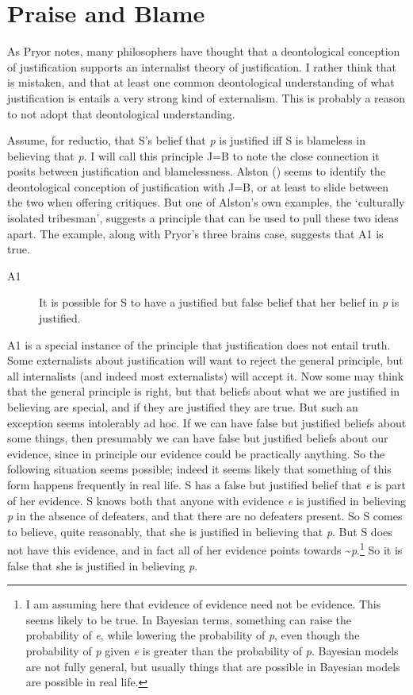 \documentclass[
  10pt,
  letterpaper,
  DIV=11,
  numbers=noendperiod,
  twoside]{scrartcl}
\begin{document}
\section{Praise and Blame}\label{praise-and-blame}

As Pryor notes, many philosophers have thought that a deontological
conception of justification supports an internalist theory of
justification. I rather think that is mistaken, and that at least one
common deontological understanding of what justification is entails a
very strong kind of externalism. This is probably a reason to not adopt
that deontological understanding.

Assume, for reductio, that S's belief that \emph{p} is justified iff S
is blameless in believing that \emph{p}. I will call this principle J=B
to note the close connection it posits between justification and
blamelessness. Alston () seems to
identify the deontological conception of justification with J=B, or at
least to slide between the two when offering critiques. But one of
Alston's own examples, the `culturally isolated tribesman', suggests a
principle that can be used to pull these two ideas apart. The example,
along with Pryor's three brains case, suggests that A1 is true.

\begin{description}
\item[A1]
It is possible for S to have a justified but false belief that her
belief in \emph{p} is justified.
\end{description}

A1 is a special instance of the principle that justification does not
entail truth. Some externalists about justification will want to reject
the general principle, but all internalists (and indeed most
externalists) will accept it. Now some may think that the general
principle is right, but that beliefs about what we are justified in
believing are special, and if they are justified they are true. But such
an exception seems intolerably ad hoc. If we can have false but
justified beliefs about some things, then presumably we can have false
but justified beliefs about our evidence, since in principle our
evidence could be practically anything. So the following situation seems
possible; indeed it seems likely that something of this form happens
frequently in real life. S has a false but justified belief that
\emph{e} is part of her evidence. S knows both that anyone with evidence
\emph{e} is justified in believing \emph{p} in the absence of defeaters,
and that there are no defeaters present. So S comes to believe, quite
reasonably, that she is justified in believing that \emph{p}. But S does
not have this evidence, and in fact all of her evidence points towards
\textasciitilde{}\emph{p}.\footnote{I am assuming here that evidence of
  evidence need not be evidence. This seems likely to be true. In
  Bayesian terms, something can raise the probability of \emph{e}, while
  lowering the probability of \emph{p}, even though the probability of
  \emph{p} given \emph{e} is greater than the probability of \emph{p}.
  Bayesian models are not fully general, but usually things that are
  possible in Bayesian models are possible in real life.} So it is false
that she is justified in believing \emph{p}.
\end{document}
